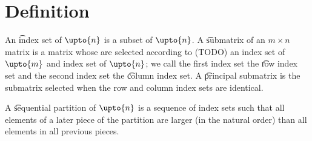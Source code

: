 
\section*{Definition}

An \t{index set} of $\upto{n}$ is a subset of $\upto{n}$.
A \t{submatrix} of an $m \times n$ matrix is a matrix whose are selected according to (TODO) an index set of $\upto{m}$ and index set of $\upto{n}$; we call the first index set the \t{row index set} and the second index set the \t{column index set}.
A \t{principal submatrix} is the submatrix selected when the row and column index sets are identical.

A \t{sequential partition} of $\upto{n}$ is a sequence of index sets such that all elements of a later piece of the partition are larger (in the natural order) than all elements in all previous pieces.


\blankpage